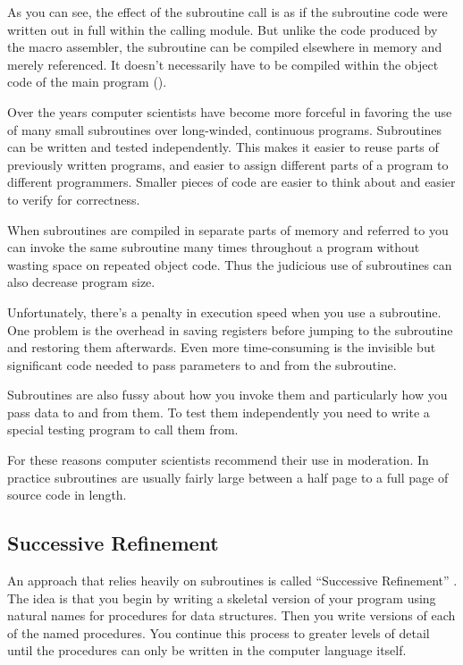 As you can see, the effect of the subroutine call is as if the
subroutine code were written out in full within the calling module.
But unlike the code produced by the macro assembler, the subroutine
can be compiled elsewhere in memory and merely referenced. It doesn't
necessarily have to be compiled within the object code of the main
program ().


Over the years computer scientists have become more forceful in
favoring the use of many small subroutines over long-winded,
continuous programs.  Subroutines can be written and tested
independently. This makes it easier to reuse parts of previously
written programs, and easier to assign different parts of a program to
different programmers. Smaller pieces of code are easier to think
about and easier to verify for correctness.

When subroutines are compiled in separate parts of memory and referred
to you can invoke the same subroutine many times throughout a program
without wasting space on repeated object code. Thus the judicious use
of subroutines can also decrease program size. 

Unfortunately, there's a penalty in execution speed when you use a
subroutine. One problem is the overhead in saving registers before
jumping to the subroutine and restoring them afterwards. Even more
time-consuming is the invisible but significant code needed to pass
parameters to and from the subroutine.

Subroutines are also fussy about how you invoke them and particularly
how you pass data to and from them. To test them independently you
need to write a special testing program to call them from.

For these reasons computer scientists recommend their use in
moderation.  In practice subroutines are usually fairly large between
a half page to a full page of source code in length.%
%


\subsection{Successive Refinement}%
%
An approach that relies heavily on subroutines is called ``Successive
Refinement'' \cite{wirth71}. The idea is that you begin by writing a
skeletal version of your program using natural names for procedures
for data structures. Then you write versions of each of the named
procedures.  You continue this process to greater levels of detail
until the procedures can only be written in the computer language
itself.

